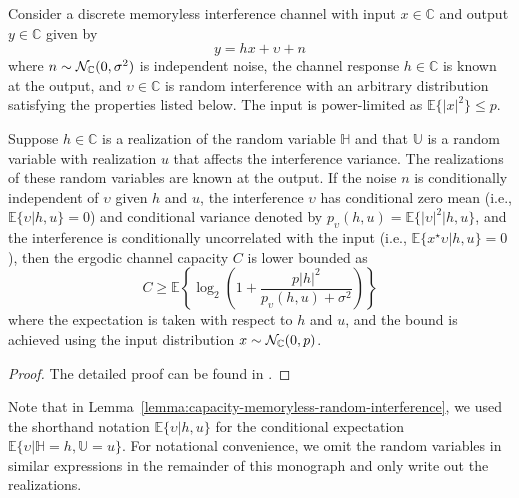 \begin{lemma} \label{lemma:capacity-memoryless-random-interference} 
Consider a discrete memoryless interference channel  with input $x \in \mathbb{C}$ and output $y \in \mathbb{C}$ given by
\begin{equation} \label{eq:interference-capacity}
y = h x + \upsilon + n
\end{equation}
where $n \sim \mathcal{N}_{\mathbb{C}}(0,\sigma^2)$ is independent noise, the channel response $h\in \mathbb{C}$ is known at the output, and $\upsilon\in \mathbb{C}$ is random interference with an arbitrary distribution satisfying the properties listed below. The input is power-limited as $\mathbb{E}\{ |x|^2 \} \leq p$.

Suppose $h\in \mathbb{C}$ is a realization of the random variable $\mathbb{H}$ and that $\mathbb{U}$ is a random variable with realization $u$ that affects the interference variance. The realizations of these random variables are known at the output. 
 If the noise $n$ is conditionally independent of $\upsilon$ given $h$ and $u$, the interference $\upsilon$ has conditional zero mean (i.e., $\mathbb{E}\{ \upsilon | h, u \}  = 0 $) and conditional variance denoted by $p_{\upsilon}(h,u) = \mathbb{E}\{ |\upsilon|^2 | h, u \}$, and the interference is conditionally uncorrelated with the input (i.e., $\mathbb{E}\{ x^{\star} \upsilon | h, u \} = 0$), then the ergodic channel capacity $C$ is lower bounded as
\begin{equation} \label{eq:capacity-fading-channel-interference}
C \geq \mathbb{E} \left\{ \log_2 \left(1+\frac{p |h|^2}{p_{\upsilon}(h,u) + \sigma^2} \right) \right\}
\end{equation}
where the expectation is taken with respect to $h$ and $u$, and the bound is achieved using the input distribution $x \sim \mathcal{N}_{\mathbb{C}}(0,p)$.
\end{lemma}
\begin{proof}
The detailed proof can be found in \cite[App.~C.1.2]{massivemimobook}.
\end{proof}

Note that in Lemma~\ref{lemma:capacity-memoryless-random-interference}, we used the shorthand notation $\mathbb{E}\{ \upsilon | h, u \} $ for the conditional expectation $\mathbb{E}\{ \upsilon | \mathbb{H}= h, \mathbb{U} = u \} $. For notational convenience, we omit the random variables in similar expressions in the remainder of this monograph and only write out the realizations.

